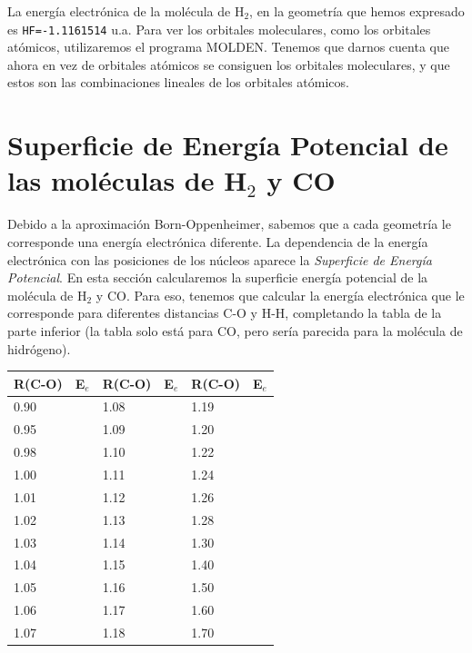 \documentclass{tufte-book}
\begin{document}
La energía electrónica de la molécula de H$_2$, en la geometría
que hemos expresado es \texttt{HF=-1.1161514} u.a. Para ver los
orbitales moleculares, como los orbitales atómicos, utilizaremos
el programa MOLDEN. Tenemos que darnos cuenta que ahora en vez 
de orbitales atómicos se consiguen los orbitales moleculares, 
y que estos son las combinaciones lineales de los orbitales
atómicos.

\section{Superficie de Energía Potencial de las moléculas de H$_2$ y CO}
Debido a la aproximación Born-Oppenheimer, sabemos que a cada
geometría le corresponde una energía electrónica diferente. La
dependencia de la energía electrónica con las posiciones de los
núcleos aparece la \textit{Superficie de Energía Potencial}. 
En esta sección calcularemos la superficie energía potencial de la 
molécula de H$_2$ y CO. Para eso, tenemos que calcular la energía
electrónica que le corresponde para diferentes distancias C-O y
H-H, completando la tabla de la parte inferior (la tabla solo está
para CO, pero sería parecida para la molécula de hidrógeno).

\begin{table}[h!]
\centering
	\small
	\begin{tabular}{ll|ll|ll}
	\toprule
		R(C-O) & E$_e$ & R(C-O) & E$_e$ & R(C-O) & E$_e$ \\
		\hline
		0.90   &       & 1.08   &       & 1.19   &        \\
		0.95   &       & 1.09   &       & 1.20   &        \\
		0.98   &       & 1.10   &       & 1.22   &        \\
		1.00   &       & 1.11   &       & 1.24   &        \\
		1.01   &       & 1.12   &       & 1.26   &        \\
		1.02   &       & 1.13   &       & 1.28   &        \\
		1.03   &       & 1.14   &       & 1.30   &        \\
		1.04   &       & 1.15   &       & 1.40   &        \\
		1.05   &       & 1.16   &       & 1.50   &        \\
		1.06   &       & 1.17   &       & 1.60   &        \\
		1.07   &       & 1.18   &       & 1.70   &        \\
	\bottomrule	
    \end{tabular}
\end{table}
\end{document}

